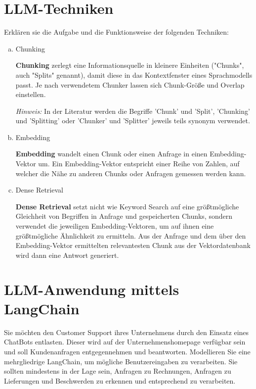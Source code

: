 \documentclass[12pt,ngerman]{AssignmentClass}
\begin{document}
    \section{LLM-Techniken}
        Erklären sie die Aufgabe und die Funktionsweise der folgenden Techniken:
        \begin{enumerate}[a)]
            \item Chunking

            \textbf{Chunking} zerlegt eine Informationsquelle in kleinere Einheiten ("Chunks", auch "Splits" genannt), damit diese in das Kontextfenster eines Sprachmodells passt. Je nach verwendetem Chunker lassen sich Chunk-Größe und Overlap einstellen.
            
            \textit{Hinweis:} In der Literatur werden die Begriffe 'Chunk' und 'Split', 'Chunking' und 'Splitting' oder 'Chunker' und 'Splitter' jeweils teils synonym verwendet.
            
            \item Embedding

            \textbf{Embedding} wandelt einen Chunk oder einen Anfrage in einen Embedding-Vektor um. Ein Embedding-Vektor entspricht einer Reihe von Zahlen, auf welcher die Nähe zu anderen Chunks oder Anfragen gemessen werden kann. 
            
            \item Dense Retrieval

            \textbf{Dense Retrieval} setzt nicht wie Keyword Search auf eine größtmögliche Gleichheit von Begriffen in Anfrage und gespeicherten Chunks, sondern verwendet die jeweiligen Embedding-Vektoren, um auf ihnen eine größtmögliche Ähnlichkeit zu ermitteln. Aus der Anfrage und dem über den Embedding-Vektor ermittelten relevantesten Chunk aus der Vektordatenbank wird dann eine Antwort generiert.
        \end{enumerate}


    
    \section{LLM-Anwendung mittels LangChain}
        Sie möchten den Customer Support ihres Unternehmens durch den Einsatz eines ChatBots entlasten. Dieser wird auf der Unternehmenshomepage verfügbar sein und soll Kundenanfragen entgegennehmen und beantworten.
        Modellieren Sie eine mehrgliedrige LangChain, um mögliche Benutzereingaben zu verarbeiten. Sie sollten mindestens in der Lage sein, Anfragen zu Rechnungen, Anfragen zu Lieferungen und Beschwerden zu erkennen und entsprechend zu verarbeiten.\\
\end{document}
